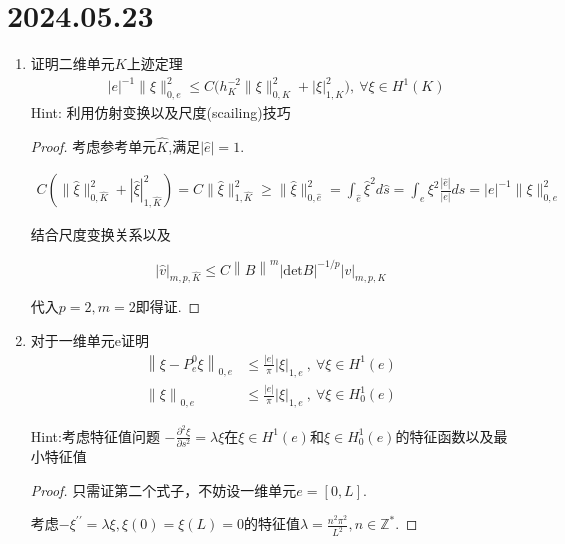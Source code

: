 \documentclass[12pt,a4paper]{article}
\begin{document}
	
	\noindent
	
	\section*{2024.05.23}	
	
	\begin{enumerate}
		\item 证明二维单元$K$上迹定理
		$$\begin{aligned}&|e|^{-1}\|\xi\|_{0,e}^{2}\leq C\Big(h_{K}^{-2}\|\xi\|_{0,K}^{2}+|\xi|_{1,K}^{2}\Big),\:\forall\xi\in H^{1}(K)\end{aligned}$$
		Hint: 利用仿射变换以及尺度(scailing)技巧
		
		\begin{proof}
			考虑参考单元$\hat{K}$,满足$|\hat{e}|=1$.
			
			\begin{equation*}
				\begin{aligned}
					C(\|\hat{\xi}\|_{0,\hat{K}}^{2}+|\hat{\xi}|_{1,\hat{K}}^{2}) = C\|\hat{\xi}\|_{1,\hat{K}}^2 \geq \|\hat{\xi}\|^2_{0,\hat{e}} = \int_{\hat{e}} \hat{\xi}^2 d\hat{s} = \int_{e}  \xi^2 \frac{|\hat{e}|}{|e|} ds = |e|^{-1}\|\xi\|_{0,e}^{2} 
				\end{aligned}
			\end{equation*}
			
			结合尺度变换关系以及
			
			$$
			|\hat{v}|_{m,p,\hat{K}}\leq C\left\|B\right\|^m|\mathrm{det}B|^{-1/p}|v|_{m,p,K}
			$$
			
			代入$p = 2, m= 2$即得证.
			
		\end{proof}
		
		\item 对于一维单元e证明
		$$\begin{aligned}\left\|\xi-P_{e}^{0}\xi\right\|_{0,e}&\leq\frac{|e|}\pi|\xi|_{1,e}\:,\:\forall\xi\in H^1(e)\\\left\|\xi\right\|_{0,e}&\leq\frac{|e|}\pi|\xi|_{1,e}\:,\:\forall\xi\in H_0^1(e)\end{aligned}$$
		
		Hint:考虑特征值问题 $-\frac{\partial^2 \xi}{\partial s^2} = \lambda \xi$在$\xi \in H^1(e)$和$\xi \in H_0^1(e)$的特征函数以及最小特征值
		
		\begin{proof}
		
			只需证第二个式子，不妨设一维单元$e = [0,L]$.
			
			考虑$-\xi ^{\prime\prime} = \lambda \xi, \xi(0) = \xi(L) = 0$的特征值$\lambda = \displaystyle \frac{n^2 \pi^2}{L^2} , n \in \mathbb{Z^*}$.
			

\end{proof}
\end{enumerate}
\end{document}
